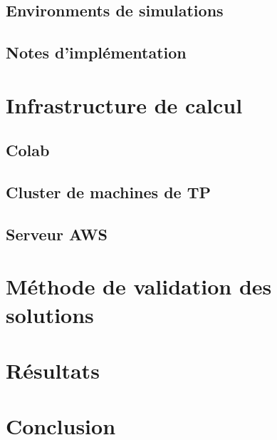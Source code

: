 \documentclass[11pt]{article}
\begin{document}
\subsection{Environments de simulations}
\label{sec:orgad5e055}

\subsection{Notes d'implémentation}
\label{sec:org99bcd80}

\section{Infrastructure de calcul}
\label{sec:orgc23a640}

\subsection{Colab}
\label{sec:orga21e5a5}

\subsection{Cluster de machines de TP}
\label{sec:orge8bbcef}

\subsection{Serveur AWS}
\label{sec:org5bd790f}

\section{Méthode de validation des solutions}
\label{sec:org2264e28}


\section{Résultats}
\label{sec:org733056c}


\section{Conclusion}
\label{sec:org470be2a}
\end{document}
